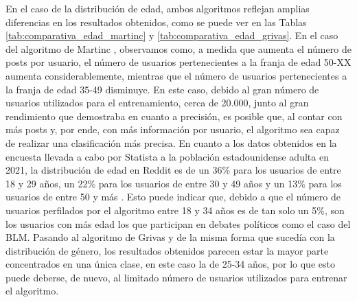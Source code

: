 \bigskip
En el caso de la distribución de edad, ambos algoritmos reflejan amplias diferencias en los resultados obtenidos, como se puede
ver en las Tablas \ref{tab:comparativa_edad_martinc} y \ref{tab:comparativa_edad_grivas}. En el caso del algoritmo de Martinc \cite{martinc2019hot}, observamos
como, a medida que aumenta el número de posts por usuario, el número de usuarios pertenecientes a la franja de edad 50-XX aumenta
considerablemente, mientras que el número de usuarios pertenecientes a la franja de edad 35-49 disminuye. En este caso, debido al gran
número de usuarios utilizados para el entrenamiento, cerca de 20.000, junto al gran rendimiento que demostraba en cuanto a precisión,
es posible que, al contar con más posts y, por ende, con más información por usuario, el algoritmo sea capaz de realizar una clasificación
más precisa. En cuanto a los datos obtenidos en la encuesta llevada a cabo por Statista a la población estadounidense adulta en 2021,
la distribución de edad en Reddit es de un 36\% para
los usuarios de entre 18 y 29 años, un 22\% para los usuarios de entre 30 y 49 años y un 13\% para los usuarios de entre 50 y más \cite{statistaedad}.
Esto puede indicar que, debido a que el número de usuarios perfilados por el algoritmo entre 18 y 34 años es de tan solo un 5\%, son los usuarios
con más edad los que participan en debates políticos como el caso del BLM.
Pasando al algoritmo de Grivas \cite{grivas2015author} y de la misma forma que sucedía con la distribución de género, los resultados obtenidos
parecen estar la mayor parte concentrados en una única clase, en este caso la de 25-34 años, por lo que esto puede deberse, de nuevo, al limitado
número de usuarios utilizados para entrenar el algoritmo.

\begin{table}[H]
	\centering
	\caption{Distribución de edad obtenida por Martinc \cite{martinc2019hot}}
	\label{tab:comparativa_edad_martinc}
\end{table}

